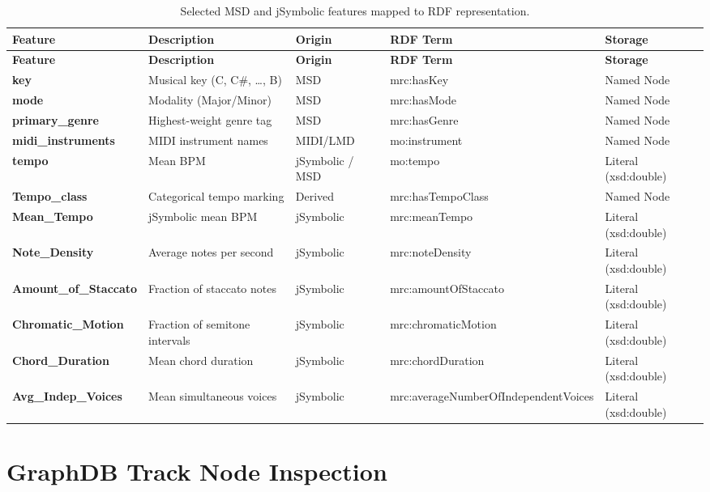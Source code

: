 \begin{longtable}{
>{\ttfamily\bfseries\RaggedRight\arraybackslash}p{}
>{\RaggedRight\arraybackslash}p{}
>{\RaggedRight\arraybackslash}p{}
>{\ttfamily\RaggedRight\arraybackslash}p{}
>{\RaggedRight\arraybackslash}p{}
}
\caption{Selected MSD and jSymbolic features mapped to RDF representation.}
\label{tab:kg_features}\\
\toprule
\textbf{Feature} & \textbf{Description} & \textbf{Origin} & \textbf{RDF Term} & \textbf{Storage}\\
\midrule
\endfirsthead
\toprule
\textbf{Feature} & \textbf{Description} & \textbf{Origin} & \textbf{RDF Term} & \textbf{Storage}\\
\midrule
\endhead
\bottomrule
\endfoot
key & Musical key (C, C\#, \ldots, B) & MSD & mrc:hasKey & Named Node\\
mode & Modality (Major/Minor) & MSD & mrc:hasMode & Named Node\\
primary\_genre & Highest-weight genre tag & MSD & mrc:hasGenre & Named Node\\
midi\_instruments & MIDI instrument names & MIDI/LMD & mo:instrument & Named Node\\
tempo & Mean BPM & jSymbolic / MSD & mo:tempo & Literal (xsd:double)\\
Tempo\_class & Categorical tempo marking & Derived & mrc:hasTempoClass & Named Node\\
Mean\_Tempo & jSymbolic mean BPM & jSymbolic & mrc:meanTempo & Literal (xsd:double)\\
Note\_Density & Average notes per second & jSymbolic & mrc:noteDensity & Literal (xsd:double)\\
Amount\_of\_Staccato & Fraction of staccato notes & jSymbolic & mrc:amountOfStaccato & Literal (xsd:double)\\
Chromatic\_Motion & Fraction of semitone intervals & jSymbolic & mrc:chromaticMotion & Literal (xsd:double)\\
Chord\_Duration & Mean chord duration & jSymbolic & mrc:chordDuration & Literal (xsd:double)\\
Avg\_Indep\_Voices & Mean simultaneous voices & jSymbolic & mrc:averageNumberOfIndependentVoices & Literal (xsd:double)\\
\end{longtable}

\section{GraphDB Track Node Inspection}

